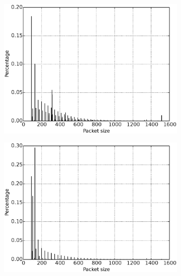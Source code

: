 \begin{figure}[h]
\centering
\begin{subfigure}{0.24\linewidth}
\centering
\includegraphics[width=\linewidth]{image/inv_pktsizes.eps}
\caption{}
\label{fig:inv_pktsizes}
\end{subfigure}
\begin{subfigure}{0.24\linewidth}
\centering
\includegraphics[width=\linewidth]{image/getdata_pktsizes.eps}
\caption{}
\label{fig:getdata_pktsizes}
\end{subfigure}
\begin{subfigure}{0.24\linewidth}
\centering

\end{subfigure}
\end{figure}
